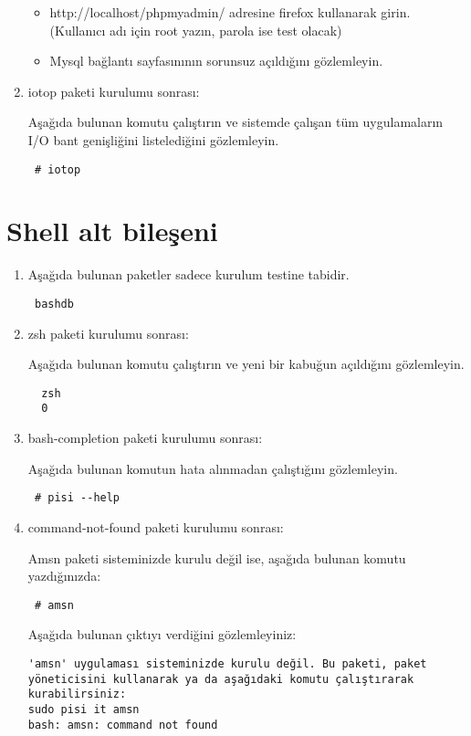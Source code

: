 \documentclass[a4paper,10pt]{article}
\begin{document}
\begin{enumerate}
\begin{itemize}
 \item http://localhost/phpmyadmin/ adresine firefox kullanarak girin. (Kullanıcı adı için root yazın, parola ise test olacak)
 \item Mysql bağlantı sayfasınının sorunsuz açıldığını gözlemleyin.
\end{itemize}



 \item iotop paketi kurulumu sonrası:

Aşağıda bulunan komutu çalıştırın ve sistemde çalışan tüm uygulamaların I/O bant genişliğini listelediğini gözlemleyin.
\begin{verbatim}
 # iotop
\end{verbatim}

\end{enumerate}
\section{Shell alt bileşeni}
\begin{enumerate}
\item Aşağıda bulunan paketler sadece kurulum testine tabidir.
\begin{verbatim}
 bashdb
\end{verbatim}

 \item zsh paketi kurulumu sonrası:

Aşağıda bulunan komutu çalıştırın ve yeni bir kabuğun açıldığını gözlemleyin.
 \begin{verbatim}
  zsh
  0
 \end{verbatim}

 \item bash-completion paketi kurulumu sonrası:

Aşağıda bulunan komutun hata alınmadan çalıştığını gözlemleyin.
\begin{verbatim}
 # pisi --help
\end{verbatim}

\item command-not-found paketi kurulumu sonrası:

Amsn paketi sisteminizde kurulu değil ise, aşağıda bulunan komutu yazdığınızda:
\begin{verbatim}
 # amsn
\end{verbatim}

Aşağıda bulunan çıktıyı verdiğini gözlemleyiniz:
\begin{verbatim}
'amsn' uygulaması sisteminizde kurulu değil. Bu paketi, paket yöneticisini kullanarak ya da aşağıdaki komutu çalıştırarak kurabilirsiniz:
sudo pisi it amsn
bash: amsn: command not found
\end{verbatim}

\end{enumerate}
\end{document}

